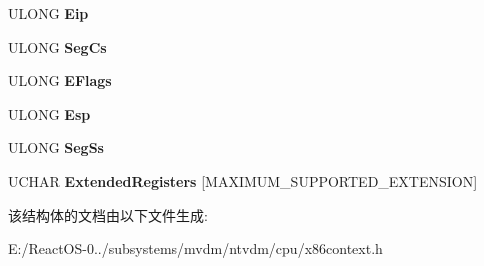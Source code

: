 \begin{DoxyCompactItemize}
U\+L\+O\+NG {\bfseries Eip}
\item 
\mbox{\label{struct___x86_c_o_n_t_e_x_t_aaf592d00d4402adb34f8e08f0505a7f3}} 
U\+L\+O\+NG {\bfseries Seg\+Cs}
\item 
\mbox{\label{struct___x86_c_o_n_t_e_x_t_a46f942139711c7a24301d3c4a487f6fe}} 
U\+L\+O\+NG {\bfseries E\+Flags}
\item 
\mbox{\label{struct___x86_c_o_n_t_e_x_t_a2403ef95d4a84df17c21423348970f5b}} 
U\+L\+O\+NG {\bfseries Esp}
\item 
\mbox{\label{struct___x86_c_o_n_t_e_x_t_aa44808553c1adbe7442031f5cf5a0d5a}} 
U\+L\+O\+NG {\bfseries Seg\+Ss}
\item 
\mbox{\label{struct___x86_c_o_n_t_e_x_t_af68bb140988b008a9a0d03b9dd30e454}} 
U\+C\+H\+AR {\bfseries Extended\+Registers} \mbox{[}M\+A\+X\+I\+M\+U\+M\+\_\+\+S\+U\+P\+P\+O\+R\+T\+E\+D\+\_\+\+E\+X\+T\+E\+N\+S\+I\+ON\mbox{]}
\end{DoxyCompactItemize}


该结构体的文档由以下文件生成\+:\begin{DoxyCompactItemize}
\item 
E\+:/\+React\+O\+S-\/0../subsystems/mvdm/ntvdm/cpu/x86context.\+h\end{DoxyCompactItemize}
